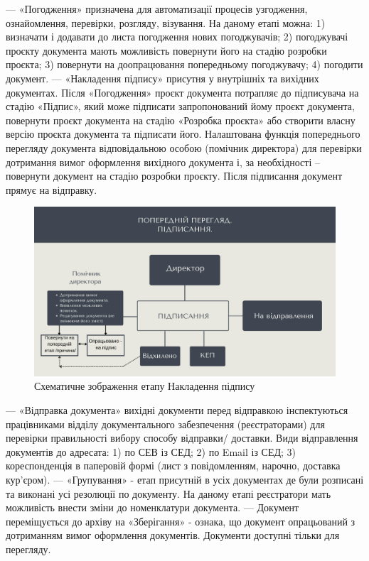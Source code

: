 --- «Погодження» призначена для автоматизації процесів узгодження,
ознайомлення, перевірки, розгляду, візування. На даному етапі можна:
1) визначати і додавати до листа погодження нових погоджувачів;
2) погоджувачі проєкту документа мають можливість повернути його
на стадію розробки проєкта;
3) повернути на доопрацювання попередньому погоджувачу;
4) погодити документ.
--- «Накладення підпису» присутня у внутрішніх та вихідних документах. Після
«Погодження» проєкт документа потрапляє до підписувача на стадію
«Підпис», який може підписати запропонований йому проєкт документа,
повернути проєкт документа на стадію «Розробка проєкта» або створити
власну версію проєкта документа та підписати його. Налаштована функція
попереднього перегляду документа відповідальною особою (помічник
директора) для перевірки дотримання вимог оформлення вихідного
документа і, за необхідності – повернути документ на стадію розробки
проєкту. Після підписання документ прямує на відправку.

\begin{figure}[!htbp]
\centerline{\includegraphics[width=\textwidth]{img/4.4.4.png}}
\caption{Схематичне зображення етапу Накладення підпису}
\end{figure}

--- «Відправка документа» вихідні документи перед відправкою інспектуються
працівниками відділу документального забезпечення (реєстраторами) для
перевірки правильності вибору способу відправки/ доставки. Види
відправлення документів до адресата:
1) по СЕВ із СЕД;
2) по Email із СЕД;
3) кореспонденція в паперовій формі (лист з повідомленням, нарочно,
доставка кур’єром).
--- «Групування» - етап присутній в усіх документах де були розписані та
виконані усі резолюції по документу. На даному етапі реєстратори мать
можливість внести зміни до номенклатури документа.
--- Документ переміщується до архіву на «Зберігання» - ознака, що документ
опрацьований з дотриманням вимог оформлення документів. Документи
доступні тільки для перегляду.

